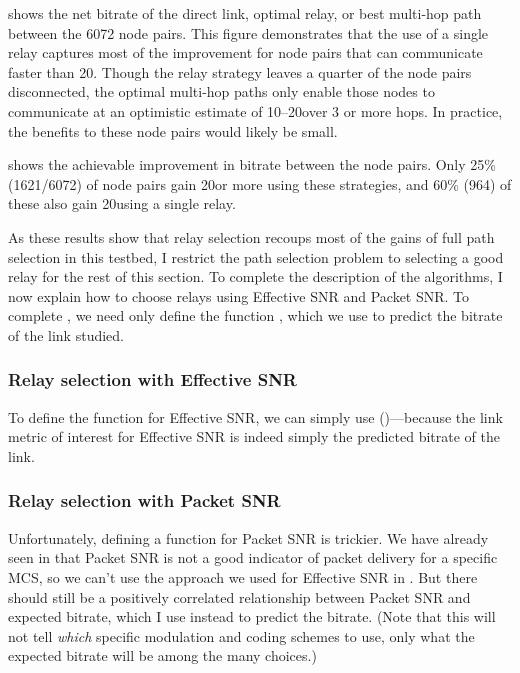  shows the net bitrate of the direct link, optimal relay, or best multi-hop path between the 6072 node pairs. This figure demonstrates that the use of a single relay captures most of the improvement for node pairs that can communicate faster than 20\Mbps. Though the relay strategy leaves a quarter of the node pairs disconnected, the optimal multi-hop paths only enable those nodes to communicate at an optimistic estimate of 10--20\Mbps over 3 or more hops. In practice, the benefits to these node pairs would likely be small.

 shows the achievable improvement in bitrate between the node pairs. Only 25\% (1621/6072) of node pairs gain 20\Mbps or more using these strategies, and 60\% (964) of these also gain 20\Mbps using a single relay.

As these results show that relay selection recoups most of the gains of full path selection in this testbed, I restrict the path selection problem to selecting a good relay for the rest of this section. To complete the description of the algorithms, I now explain how to choose relays using Effective SNR and Packet SNR. To complete , we need only define the function , which we use to predict the bitrate of the link studied.

\subsubsection{Relay selection with Effective SNR}
To define the function  for Effective SNR, we can simply use  ()---because the link metric of interest for Effective SNR is indeed simply the predicted bitrate of the link.

\subsubsection{Relay selection with Packet SNR}
Unfortunately, defining a  function for Packet SNR is trickier. We have already seen in  that Packet SNR is not a good indicator of packet delivery for a specific MCS, so we can't use the approach we used for Effective SNR in . But there should still be a positively correlated relationship between Packet SNR and expected bitrate, which I use instead to predict the bitrate. (Note that this will not tell \emph{which} specific modulation and coding schemes to use, only what the expected bitrate will be among the many choices.)

